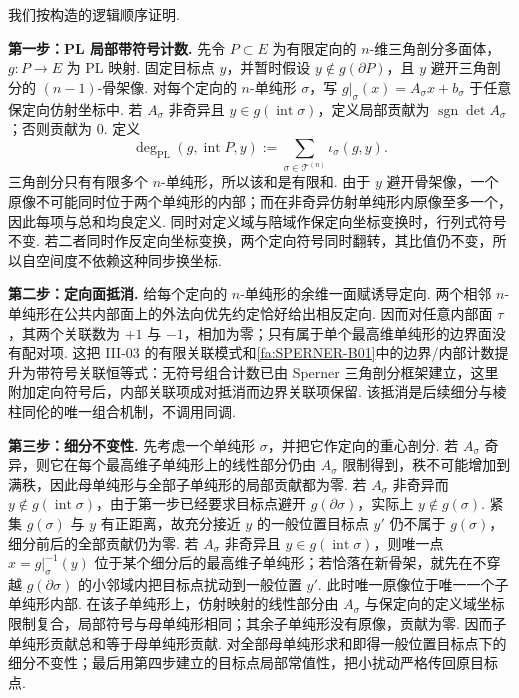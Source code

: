 \begin{FAProof}
我们按构造的逻辑顺序证明.

\textbf{第一步：PL 局部带符号计数.} 先令 \(\displaystyle P\subset E\) 为有限定向的 \(\displaystyle n\)-维三角剖分多面体，\(\displaystyle g:P\to E\) 为 PL 映射. 固定目标点 \(\displaystyle y\)，并暂时假设 \(\displaystyle y\notin g(\partial P)\)，且 \(\displaystyle y\) 避开三角剖分的 \(\displaystyle(n-1)\)-骨架像. 对每个定向的 \(\displaystyle n\)-单纯形 \(\displaystyle\sigma\)，写
\(\displaystyle g|_{\sigma}(x)=A_{\sigma}x+b_{\sigma}\)
于任意保定向仿射坐标中. 若 \(\displaystyle A_{\sigma}\) 非奇异且 \(\displaystyle y\in g(\operatorname{int}\sigma)\)，定义局部贡献为 \(\displaystyle\operatorname{sgn}\det A_{\sigma}\)；否则贡献为 \(\displaystyle0\). 定义
\[
\deg_{\mathrm{PL}}(g,\operatorname{int}P,y)
:=
\sum_{\sigma\in\mathcal T^{(n)}}
\iota_{\sigma}(g,y).
\]
三角剖分只有有限多个 \(\displaystyle n\)-单纯形，所以该和是有限和. 由于 \(\displaystyle y\) 避开骨架像，一个原像不可能同时位于两个单纯形的内部；而在非奇异仿射单纯形内原像至多一个，因此每项与总和均良定义. 同时对定义域与陪域作保定向坐标变换时，行列式符号不变. 若二者同时作反定向坐标变换，两个定向符号同时翻转，其比值仍不变，所以自空间度不依赖这种同步换坐标.

\textbf{第二步：定向面抵消.} 给每个定向的 \(\displaystyle n\)-单纯形的余维一面赋诱导定向. 两个相邻 \(\displaystyle n\)-单纯形在公共内部面上的外法向优先约定恰好给出相反定向. 因而对任意内部面 \(\displaystyle\tau\)，其两个关联数为 \(\displaystyle+1\) 与 \(\displaystyle-1\)，相加为零；只有属于单个最高维单纯形的边界面没有配对项. 这把 III-03 的有限关联模式和\autoref{fa:SPERNER-B01}中的边界/内部计数提升为带符号关联恒等式：无符号组合计数已由 Sperner 三角剖分框架建立，这里附加定向符号后，内部关联项成对抵消而边界关联项保留. 该抵消是后续细分与棱柱同伦的唯一组合机制，不调用同调.

\textbf{第三步：细分不变性.} 先考虑一个单纯形 \(\displaystyle\sigma\)，并把它作定向的重心剖分. 若 \(\displaystyle A_{\sigma}\) 奇异，则它在每个最高维子单纯形上的线性部分仍由 \(\displaystyle A_{\sigma}\) 限制得到，秩不可能增加到满秩，因此母单纯形与全部子单纯形的局部贡献都为零. 若 \(\displaystyle A_{\sigma}\) 非奇异而 \(\displaystyle y\notin g(\operatorname{int}\sigma)\)，由于第一步已经要求目标点避开 \(\displaystyle g(\partial\sigma)\)，实际上 \(\displaystyle y\notin g(\sigma)\). 紧集 \(\displaystyle g(\sigma)\) 与 \(\displaystyle y\) 有正距离，故充分接近 \(\displaystyle y\) 的一般位置目标点 \(\displaystyle y'\) 仍不属于 \(\displaystyle g(\sigma)\)，细分前后的全部贡献仍为零. 若 \(\displaystyle A_{\sigma}\) 非奇异且 \(\displaystyle y\in g(\operatorname{int}\sigma)\)，则唯一点 \(\displaystyle x=g|_{\sigma}^{-1}(y)\) 位于某个细分后的最高维子单纯形；若恰落在新骨架，就先在不穿越 \(\displaystyle g(\partial\sigma)\) 的小邻域内把目标点扰动到一般位置 \(\displaystyle y'\). 此时唯一原像位于唯一一个子单纯形内部. 在该子单纯形上，仿射映射的线性部分由 \(\displaystyle A_{\sigma}\) 与保定向的定义域坐标限制复合，局部符号与母单纯形相同；其余子单纯形没有原像，贡献为零. 因而子单纯形贡献总和等于母单纯形贡献. 对全部母单纯形求和即得一般位置目标点下的细分不变性；最后用第四步建立的目标点局部常值性，把小扰动严格传回原目标点.


\end{FAProof}
